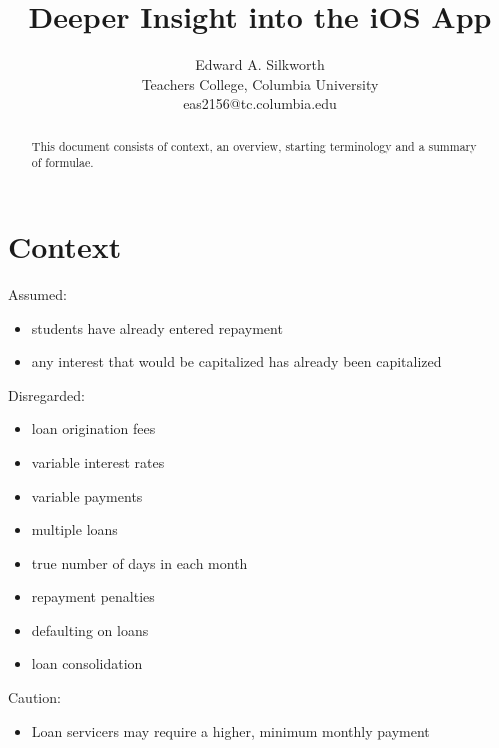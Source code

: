 \documentclass[12pt,letterpaper,oneside]{article}
\theoremstyle{remark} %
\begin{document}
\title{Deeper Insight into the iOS App}
\author{Edward A. Silkworth\\
Teachers College, Columbia University\\
eas2156@tc.columbia.edu}
\date{}

\maketitle

\begin{abstract}
This document consists of context, an overview, starting terminology and a summary of formulae.
\end{abstract}

\section{Context}

	Assumed:
	\begin{itemize}
	\item students have already entered repayment
	\item any interest that would be capitalized has already been capitalized
	\end{itemize}

	\vspace{12pt}
	\setlength\parindent{0pt} Disregarded:
	\begin{itemize}
	\item loan origination fees
	\item variable interest rates
	\item variable payments
	\item multiple loans
	\item true number of days in each month
	\item repayment penalties
	\item defaulting on loans
	\item loan consolidation
	\end{itemize}

	\vspace{12pt}
	Caution:
	\begin{itemize}
	\item Loan servicers may require a higher, minimum monthly payment 
	\end{itemize}

	\newpage
\end{document}
